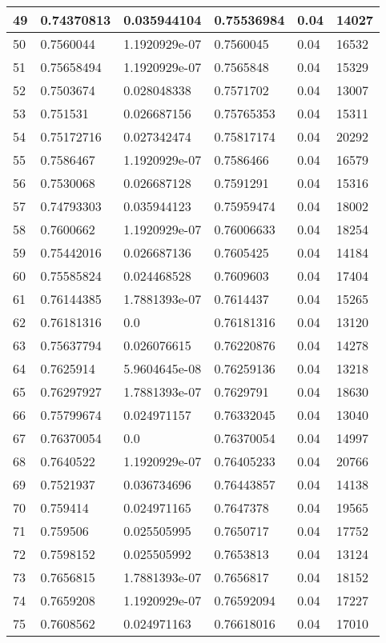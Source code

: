 \begin{longtable}{|l|l|l|l|l|l|}
49 & 0.74370813 & 0.035944104 & 0.75536984 & 0.04 & 14027 \\ \hline 
50 & 0.7560044 & 1.1920929e-07 & 0.7560045 & 0.04 & 16532 \\ \hline 
51 & 0.75658494 & 1.1920929e-07 & 0.7565848 & 0.04 & 15329 \\ \hline 
52 & 0.7503674 & 0.028048338 & 0.7571702 & 0.04 & 13007 \\ \hline 
53 & 0.751531 & 0.026687156 & 0.75765353 & 0.04 & 15311 \\ \hline 
54 & 0.75172716 & 0.027342474 & 0.75817174 & 0.04 & 20292 \\ \hline 
55 & 0.7586467 & 1.1920929e-07 & 0.7586466 & 0.04 & 16579 \\ \hline 
56 & 0.7530068 & 0.026687128 & 0.7591291 & 0.04 & 15316 \\ \hline 
57 & 0.74793303 & 0.035944123 & 0.75959474 & 0.04 & 18002 \\ \hline 
58 & 0.7600662 & 1.1920929e-07 & 0.76006633 & 0.04 & 18254 \\ \hline 
59 & 0.75442016 & 0.026687136 & 0.7605425 & 0.04 & 14184 \\ \hline 
60 & 0.75585824 & 0.024468528 & 0.7609603 & 0.04 & 17404 \\ \hline 
61 & 0.76144385 & 1.7881393e-07 & 0.7614437 & 0.04 & 15265 \\ \hline 
62 & 0.76181316 & 0.0 & 0.76181316 & 0.04 & 13120 \\ \hline 
63 & 0.75637794 & 0.026076615 & 0.76220876 & 0.04 & 14278 \\ \hline 
64 & 0.7625914 & 5.9604645e-08 & 0.76259136 & 0.04 & 13218 \\ \hline 
65 & 0.76297927 & 1.7881393e-07 & 0.7629791 & 0.04 & 18630 \\ \hline 
66 & 0.75799674 & 0.024971157 & 0.76332045 & 0.04 & 13040 \\ \hline 
67 & 0.76370054 & 0.0 & 0.76370054 & 0.04 & 14997 \\ \hline 
68 & 0.7640522 & 1.1920929e-07 & 0.76405233 & 0.04 & 20766 \\ \hline 
69 & 0.7521937 & 0.036734696 & 0.76443857 & 0.04 & 14138 \\ \hline 
70 & 0.759414 & 0.024971165 & 0.7647378 & 0.04 & 19565 \\ \hline 
71 & 0.759506 & 0.025505995 & 0.7650717 & 0.04 & 17752 \\ \hline 
72 & 0.7598152 & 0.025505992 & 0.7653813 & 0.04 & 13124 \\ \hline 
73 & 0.7656815 & 1.7881393e-07 & 0.7656817 & 0.04 & 18152 \\ \hline 
74 & 0.7659208 & 1.1920929e-07 & 0.76592094 & 0.04 & 17227 \\ \hline 
75 & 0.7608562 & 0.024971163 & 0.76618016 & 0.04 & 17010 \\ \hline 
\end{longtable}